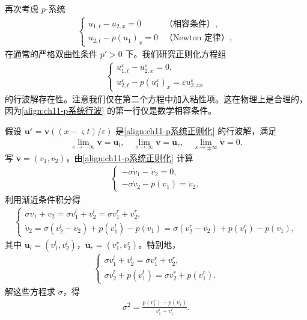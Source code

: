 \documentclass[../../main.tex]{subfiles}
\begin{document}
\begin{example}[$p$-系统的行波。]\label{example:ch11-p系统行波}再次考虑 $p$-系统
\begin{align}
\begin{cases}
u_{1,t}-u_{2,x}=0 & \text{（相容条件）},\\
u_{2,t}-p(u_1)_x=0 & \text{（Newton 定律）},
\end{cases}
\label{align:ch11-p系统行波}
\end{align}
在通常的严格双曲性条件 $p'>0$ 下。我们研究正则化方程组
\begin{align}
\begin{cases}
u^\varepsilon_{1,t}-u^\varepsilon_{2,x}=0,\\
u^\varepsilon_{2,t}-p(u^\varepsilon_1)_x=\varepsilon u^\varepsilon_{2,xx}
\end{cases}
\label{align:ch11-p系统正则化}
\end{align}
的行波解存在性。注意我们仅在第二个方程中加入粘性项。这在物理上是合理的，因为\eqref{align:ch11-p系统行波} 的第一行仅是数学相容条件。

假设 $\mathbf{u}^\varepsilon=\mathbf{v}((x-\varsigma t)/\varepsilon)$ 是\eqref{align:ch11-p系统正则化} 的行波解，满足
\begin{align*}
\lim_{s\to-\infty}\mathbf{v}=\mathbf{u}_l,\quad \lim_{s\to\infty}\mathbf{v}=\mathbf{u}_r,\quad \lim_{s\to\pm\infty}\dot{\mathbf{v}}=0.
\end{align*}
写 $\mathbf{v}=(v_1,v_2)$，由\eqref{align:ch11-p系统正则化} 计算
\begin{align*}
\begin{cases}
-\sigma\dot{v}_1-\dot{v}_2=0,\\
-\sigma\dot{v}_2-p(v_1)\dot{=}\ddot{v}_2.
\end{cases}
\end{align*}
利用渐近条件积分得
\begin{align*}
\begin{cases}
\sigma v_1+v_2=\sigma v_1^l+v_2^l=\sigma v_1^r+v_2^r,\\
\dot{v}_2=\sigma(v_2^l-v_2)+p(v_1^l)-p(v_1)=\sigma(v_2^r-v_2)+p(v_1^r)-p(v_1),
\end{cases}
\end{align*}
其中 $\mathbf{u}_l=(v_1^l,v_2^l)$，$\mathbf{u}_r=(v_1^r,v_2^r)$。特别地，
\begin{align*}
\begin{cases}
\sigma v_1^l+v_2^l=\sigma v_1^r+v_2^r,\\
\sigma v_2^l+p(v_1^l)=\sigma v_2^r+p(v_1^r).
\end{cases}
\end{align*}
解这些方程求 $\sigma$，得
\begin{align}
\sigma^2=\frac{p(v_1^r)-p(v_1^l)}{v_1^r-v_1^l}.
\label{align:ch11-p系统速度}
\end{align}


\end{example}
\end{document}

